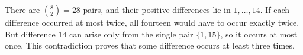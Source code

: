 There are $\binom82=28$ pairs, and their positive differences lie in $1,\ldots,14$. If each difference occurred at most twice, all fourteen would have to occur exactly twice. But difference $14$ can arise only from the single pair $\{1,15\}$, so it occurs at most once. This contradiction proves that some difference occurs at least three times.
